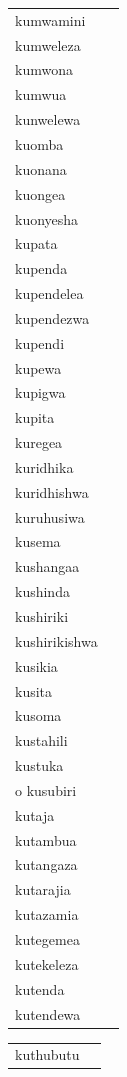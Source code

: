 \documentclass[output=paper,colorlinks,citecolor=brown]{langscibook}
\begin{document}
\begin{table}
\begin{footnotesize}
\begin{minipage}{.24\textwidth}
\begin{tabular}{ll}
kumwamini \\ 
kumweleza \\ 
kumwona \\ 

kumwua \\ 
kunwelewa \\ 
kuomba \\ 
kuonana \\ 
kuongea \\ 
kuonyesha \\ 
kupata \\ 
kupenda \\ 
kupendelea \\ 
kupendezwa \\ 
kupendi \\ 
kupewa \\ 
kupigwa \\ 
kupita \\ 
kuregea \\ 
kuridhika \\ 
kuridhishwa \\ 
kuruhusiwa \\ 
kusema \\ 
kushangaa \\ 
kushinda \\ 
kushiriki \\ 
kushirikishwa \\ 
kusikia \\ 
kusita \\ 
kusoma \\ 
kustahili \\ 
kustuka \\ o
kusubiri \\ 
kutaja \\ 
kutambua \\ 
kutangaza \\ 
kutarajia \\ 
kutazamia \\ 
kutegemea \\ 
kutekeleza \\ 
kutenda \\ 
kutendewa \\ 


\end{tabular}
\end{minipage}
\begin{minipage}{.24\textwidth}
\begin{tabular}{ll} 
kuthubutu \\ 


\end{tabular}
\end{minipage}
\end{footnotesize}
\end{table}
\end{document}
